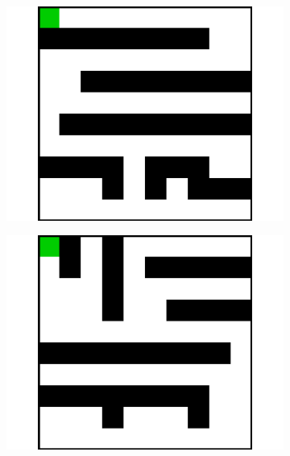 \documentclass{article}
\begin{document}
\begin{figure}[t]
  \begin{subfigure}[t]{0.18\textwidth}
    \includegraphics[width=\textwidth]{images/maze/maze5.pdf}
    \caption{}
  \end{subfigure}
  \begin{subfigure}[t]{0.18\textwidth}
    \includegraphics[width=\textwidth]{images/maze/maze6.pdf}
    \caption{}
  \end{subfigure}
  \begin{subfigure}[t]{0.18\textwidth}

\end{subfigure}
\end{figure}
\end{document}
